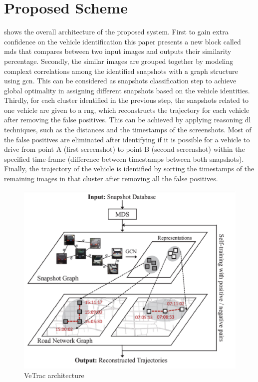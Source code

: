 \section{Proposed Scheme}
\label{sec:scheme}
 shows the overall architecture of the proposed system.
First to gain extra confidence on the vehicle identification this paper presents a new block called \ac{mds} that compares between two input images and outputs their similarity percentage.
Secondly, the similar images are grouped together by modeling complext correlations among the identified snapshots with a graph structure using \ac{gcn}.
This can be considered as snapshots classification step to achieve global optimality in assigning different snapshots based on the vehicle identities.
Thirdly, for each cluster identified in the previous step, the snapshots related to one vehicle are given to a \ac{rng}, which reconstructs the trajectory for each vehicle after removing the false positives.
This can be achieved by applying reasoning \ac{dl} techniques, such as the distances and the timestamps of the screenshots.
Most of the false positives are eliminated after identifying if it is possible for a vehicle to drive from point A (first screenshot) to point B (second screenshot) within the specified time-frame (difference between timestamps between both snapshots).
Finally, the trajectory of the vehicle is identified by sorting the timestamps of the remaining images in that cluster after removing all the false positives.

\begin{figure}
\centering
  \includegraphics[width=1\linewidth]{figures/VeTrack-architecture.eps}
  \caption{VeTrac architecture \cite{tong2021large}}
  \label{fig:vetrac-architecture}
\end{figure}

